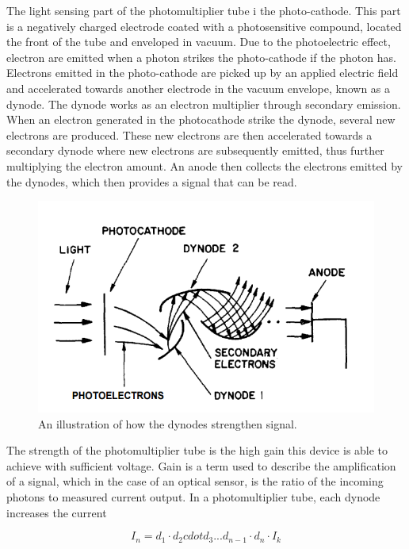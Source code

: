 The light sensing part of the photomultiplier tube i the photo-cathode. This part is a negatively charged electrode coated with a photosensitive compound, located  the front of the tube and enveloped in vacuum. Due to the photoelectric effect, electron are emitted when a photon strikes the photo-cathode if the photon has. Electrons emitted in the photo-cathode are picked up by an applied electric field and accelerated towards another electrode in the vacuum envelope, known as a dynode. The dynode works as an electron multiplier through secondary emission. When an electron generated in the photocathode strike the dynode, several new electrons are produced. These new electrons are then accelerated towards a secondary dynode where new electrons are subsequently emitted, thus further multiplying the electron amount. An anode then collects the electrons emitted by the dynodes, which then provides a signal that can be read.

\begin{figure}[htb]
\begin{center}
\includegraphics[scale=0.6]{figures/RCS/PMT}
\caption{An illustration of how the dynodes strengthen signal.}
\label{fig:PMT_dynode}
\end{center}
\end{figure}

The strength of the photomultiplier tube is the high gain this device is able to achieve with sufficient voltage. Gain is a term used to describe the amplification of a signal, which in the case of an optical sensor, is the ratio of the incoming photons to measured current output. In a photomultiplier tube, each dynode increases the current

\begin{equation}
    I_n = d_1 \cdot d_2 cdot d_3 ... d_{n-1} \cdot d_n \cdot I_k
\end{equation}

